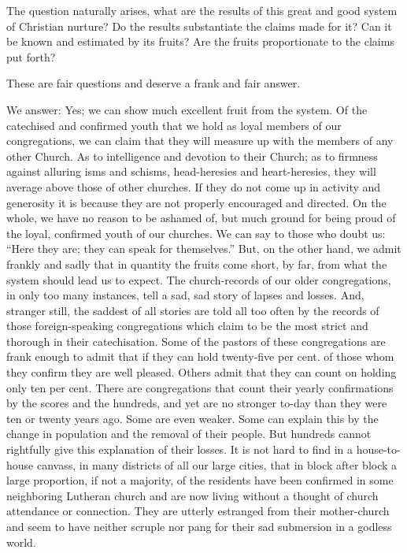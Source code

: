 The question naturally arises, what are the results of this great and good system of Christian nurture? Do the results substantiate the claims made for it? Can it be known and estimated by its fruits? Are the fruits proportionate to the claims put forth?

These are fair questions and deserve a frank and fair answer.

We answer: Yes; we can show much excellent fruit from the system.  Of the catechised and confirmed youth that we hold as loyal members of our congregations, we can claim that they will measure up with the members of any other Church. As to intelligence and devotion to their Church; as to firmness against alluring isms and schisms, head-heresies and heart-heresies, they will average above those of other churches. If they do not come up in activity and generosity it is because they are not properly encouraged and directed. On the whole, we have no reason to be ashamed of, but much ground for being proud of the loyal, confirmed youth of our churches. We can say to those who doubt us: “Here they are; they can speak for themselves.”
 But, on the other hand, we admit frankly and sadly that in quantity the fruits come short, by far, from what the system should lead us to expect. The church-records of our older congregations, in only too many instances, tell a sad, sad story of lapses and losses. And, stranger still, the saddest of all stories are told all too often by the records of those foreign-speaking congregations which claim to be the most strict and thorough in their catechisation. Some of the pastors of these congregations are frank enough to admit that if they can hold twenty-five per cent. of those whom they confirm they are well pleased. Others admit that they can count on holding only ten per cent. There are congregations that count their yearly confirmations by the scores and the hundreds, and yet are no stronger to-day than they were ten or twenty years ago. Some are even weaker. Some can explain this by the change in population and the removal of their people. But hundreds cannot rightfully give this explanation of their losses. It is not hard to find in a house-to-house canvass, in many districts of all our large cities, that in block after block a large proportion, if not a majority, of the residents have been confirmed in some neighboring Lutheran church and are now living without a thought of church attendance or connection. They are utterly estranged from their mother-church and seem to have neither
scruple nor pang for their sad submersion in a godless world.

